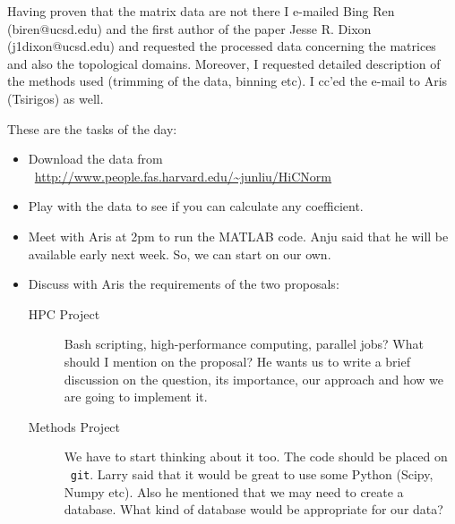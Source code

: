 \documentclass[idxtotoc,hyperref,openany]{labbook} %
\begin{document}
Having proven that the matrix data are not there I e-mailed Bing Ren (biren@ucsd.edu) and the first author of the paper Jesse R. Dixon (j1dixon@ucsd.edu) and requested the processed data concerning the matrices and also 
the topological domains. Moreover, I requested detailed description of the
methods used (trimming of the data, binning etc). I cc'ed the e-mail to
Aris (Tsirigos) as well.







These are the tasks of the day:

\begin{itemize}
\item Download the data from ~\url{http://www.people.fas.harvard.edu/~junliu/HiCNorm}
\item Play with the data to see if you can calculate any coefficient.
\item Meet with Aris at 2pm to run the MATLAB code. Anju said that he will be available
early next week. So, we can start on our own.
\item Discuss with Aris the requirements of the two proposals:
	\begin{description}
		\item [HPC Project] Bash scripting, high-performance computing, parallel jobs? What should I mention on the proposal? He wants us to write a brief discussion on the question, its importance, our approach and how we are going to implement it.
		\item [Methods Project] We have to start thinking about it too. The code should be placed on ~\texttt{git}. Larry said that it would be great to use some Python 
		(Scipy, Numpy etc). Also he mentioned that we may need to create a database. What kind of database would be appropriate for our data? 
	\end{description}
\end{itemize}





\end{document}
